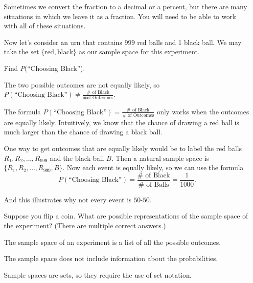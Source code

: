 \documentclass{ximera}
\begin{document}
Sometimes we convert the fraction to a decimal or a percent, but there are many situations in which we leave it as a fraction. You will need to be able to work with all of these situations.

Now let's consider an urn that contains 999 red balls and 1 black ball. We may take the set $\{ \text{red}, \text{black} \}$ as our sample space for this experiment. 

\begin{question}
Find $P($``Choosing Black'').

    \begin{multipleChoice}
      \end{multipleChoice}
    \begin{hint}
    The two possible outcomes are not equally likely, so $P(\text{``Choosing Black''})\ne\frac{\text{$\#$ of Black}}{\text{\# of Outcomes}}$.
    \end{hint}

\end{question}

The formula $P(\text{``Choosing Black''})=\frac{\#\text{ of Black}}{\#\text{ of Outcomes}}$ only works when the outcomes are equally likely. 
Intuitively, we know that the chance of drawing a red ball is much larger than the chance of drawing a black ball. 

One way to get outcomes that are equally likely would be to label the red balls $R_1,R_2,\ldots, R_{999}$ and the black ball $B$. Then a natural sample space is $\{R_1,R_2,\ldots,R_{999},B\}$. Now each event is equally likely, so we can use the formula 
\[
P(\text{``Choosing Black''})=\frac{\#\text{ of Black}}{\#\text{ of Balls}}=\frac{1}{1000}.
\]

And this illustrates why not every event is $50$-$50$.


\begin{question}
Suppose you flip a coin. What are possible representations of the sample space of the experiment? (There are multiple correct answers.)

    \begin{multipleChoice}
      \end{multipleChoice}
    \begin{hint}
    The sample space of an experiment is a list of all the possible outcomes.
    \end{hint}
    \begin{hint}
    The sample space does not include information about the probabilities.
    \end{hint}
    \begin{hint}
    Sample spaces are sets, so they require the use of set notation.
    \end{hint}

\end{question}
\end{document}
